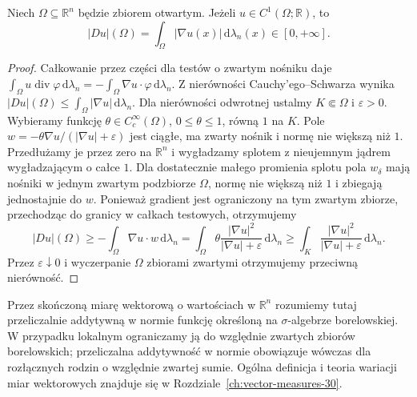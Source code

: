 \begin{lemat}
\label{lem:BV-smooth-29}
Niech $\Omega\subseteq\mathbb R^n$ będzie zbiorem otwartym.
Jeżeli $u\in C^1(\Omega;\mathbb R)$,
to
\[
 |Du|(\Omega)=\int_\Omega|\nabla u(x)|
 \,\mathrm d\lambda_n(x)\in[0,+\infty].
\]
\end{lemat}
\begin{proof}
Całkowanie przez części dla testów o zwartym nośniku
daje $\int_\Omega u\operatorname{div}\varphi\,\mathrm d\lambda_n=-\int_\Omega\nabla u\cdot\varphi\,\mathrm d\lambda_n$.
Z nierówności Cauchy'ego--Schwarza wynika
$|Du|(\Omega)\le\int_\Omega|\nabla u|\,\mathrm d\lambda_n$.
Dla nierówności odwrotnej ustalmy $K\Subset\Omega$
i $\varepsilon>0$. Wybieramy funkcję $\theta\in C_c^\infty(\Omega)$,
$0\le\theta\le1$, równą $1$ na $K$. Pole
$w=-\theta\nabla u/(|\nabla u|+\varepsilon)$
jest ciągłe, ma zwarty nośnik i normę nie większą niż $1$.
Przedłużamy je przez zero na $\mathbb R^n$ i wygładzamy
splotem z nieujemnym jądrem wygładzającym o całce $1$.
Dla dostatecznie małego promienia splotu pola $w_\delta$
mają nośniki w jednym zwartym podzbiorze $\Omega$,
normę nie większą niż $1$ i zbiegają jednostajnie do $w$.
Ponieważ gradient jest ograniczony na tym zwartym zbiorze,
przechodząc do granicy w całkach testowych, otrzymujemy
\[
 |Du|(\Omega)\ge -\int_\Omega\nabla u\cdot w\,\mathrm d\lambda_n
 =\int_\Omega\theta\frac{|\nabla u|^2}{|\nabla u|+\varepsilon}
 \,\mathrm d\lambda_n
 \ge\int_K\frac{|\nabla u|^2}{|\nabla u|+\varepsilon}\,\mathrm d\lambda_n.
\]
Przez $\varepsilon\downarrow0$ i wyczerpanie $\Omega$
zbiorami zwartymi otrzymujemy przeciwną nierówność.
\end{proof}

Przez skończoną miarę wektorową o wartościach
w $\mathbb R^n$ rozumiemy tutaj przeliczalnie
addytywną w normie funkcję określoną na
$\sigma$-algebrze borelowskiej. W przypadku lokalnym
ograniczamy ją do względnie zwartych zbiorów
borelowskich; przeliczalna addytywność w normie
obowiązuje wówczas dla rozłącznych rodzin
o względnie zwartej sumie. Ogólna definicja
i teoria wariacji miar wektorowych znajduje się w
Rozdziale~\ref{ch:vector-measures-30}.

